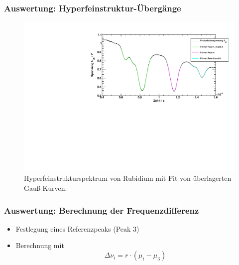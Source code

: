 \begin{frame}
\frametitle{Auswertung: Hyperfeinstruktur-Übergänge}
\begin{figure}[H]
    \centering
    \includegraphics[width=\textwidth]{../img/down-hfs_zoom_fit.pdf}  %
    \caption{Hyperfeinstrukturspektrum von Rubidium mit Fit von überlagerten Gauß-Kurven.}
\end{figure}
\end{frame}


\begin{frame}
\frametitle{Auswertung: Berechnung der Frequenzdifferenz}
\begin{itemize}[<+->]
    \item Festlegung eines Referenzpeaks (Peak 3)
    \item Berechnung mit
    \begin{equation*}
        \Delta \nu_i = r \cdot \left( \mu_i - \mu_3 \right)
    \end{equation*}
\end{itemize}
\end{frame}


